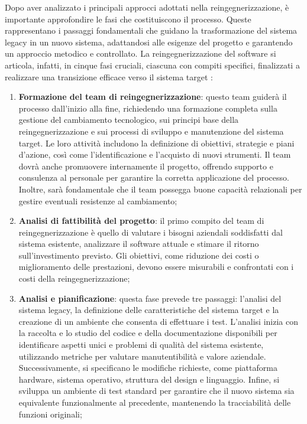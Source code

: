 Dopo aver analizzato i principali approcci adottati nella reingegnerizzazione, è importante approfondire le fasi che costituiscono il processo. Queste rappresentano i passaggi fondamentali che guidano la trasformazione del sistema legacy in un nuovo sistema, adattandosi alle esigenze del progetto e garantendo un approccio metodico e controllato. La reingegnerizzazione del software si articola, infatti, in cinque fasi cruciali, ciascuna con compiti specifici, finalizzati a realizzare una transizione efficace verso il sistema target \cite{rosenberg1996software}:
\begin{enumerate}
  \item \textbf{Formazione del team di reingegnerizzazione}: questo team guiderà il processo dall'inizio alla fine, richiedendo una formazione completa sulla gestione del cambiamento tecnologico, sui principi base della reingegnerizzazione e sui processi di sviluppo e manutenzione del sistema target. Le loro attività includono la definizione di obiettivi, strategie e piani d'azione, così come l'identificazione e l'acquisto di nuovi strumenti. Il team dovrà anche promuovere internamente il progetto, offrendo supporto e consulenza al personale per garantire la corretta applicazione del processo. Inoltre, sarà fondamentale che il team possegga buone capacità relazionali per gestire eventuali resistenze al cambiamento;

  \item \textbf{Analisi di fattibilità del progetto}: il primo compito del team di reingegnerizzazione è quello di valutare i bisogni aziendali soddisfatti dal sistema esistente, analizzare il software attuale e stimare il ritorno sull'investimento previsto. Gli obiettivi, come riduzione dei costi o miglioramento delle prestazioni, devono essere misurabili e confrontati con i costi della reingegnerizzazione;

  \item \textbf{Analisi e pianificazione}: questa fase prevede tre passaggi: l'analisi del sistema legacy, la definizione delle caratteristiche del sistema target e la creazione di un ambiente che consenta di effettuare i test. L'analisi inizia con la raccolta e lo studio del codice e della documentazione disponibili per identificare aspetti unici e problemi di qualità del sistema esistente, utilizzando metriche per valutare manutentibilità e valore aziendale. Successivamente, si specificano le modifiche richieste, come piattaforma hardware, sistema operativo, struttura del design e linguaggio. Infine, si sviluppa un ambiente di test standard per garantire che il nuovo sistema sia equivalente funzionalmente al precedente, mantenendo la tracciabilità delle funzioni originali;


\end{enumerate}
